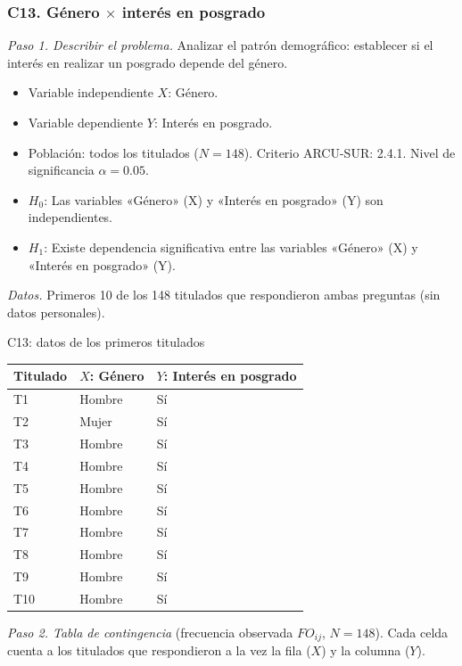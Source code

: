 \subsubsection*{C13. Género $\times$ interés en posgrado}

\textit{Paso 1. Describir el problema.} Analizar el patrón demográfico: establecer si el interés en realizar un posgrado depende del género.

\begin{itemize}[nosep]
  \item Variable independiente $X$: Género.
  \item Variable dependiente $Y$: Interés en posgrado.
  \item Población: todos los titulados ($N = 148$). Criterio ARCU-SUR: 2.4.1. Nivel de significancia $\alpha = 0.05$.
  \item $H_0$: Las variables «Género» (X) y «Interés en posgrado» (Y) son independientes.
  \item $H_1$: Existe dependencia significativa entre las variables «Género» (X) y «Interés en posgrado» (Y).
\end{itemize}

\textit{Datos.} Primeros 10 de los 148 titulados que respondieron ambas preguntas (sin datos personales).

\begin{mitabla}{C13: datos de los primeros titulados}
\begin{tabular}{lll}
\toprule
Titulado & $X$: Género & $Y$: Interés en posgrado \\
\midrule
T1 & Hombre & Sí \\
T2 & Mujer & Sí \\
T3 & Hombre & Sí \\
T4 & Hombre & Sí \\
T5 & Hombre & Sí \\
T6 & Hombre & Sí \\
T7 & Hombre & Sí \\
T8 & Hombre & Sí \\
T9 & Hombre & Sí \\
T10 & Hombre & Sí \\
\bottomrule
\end{tabular}
\end{mitabla}

\textit{Paso 2. Tabla de contingencia} (frecuencia observada $FO_{ij}$, $N = 148$). Cada celda cuenta a los titulados que respondieron a la vez la fila ($X$) y la columna ($Y$).

